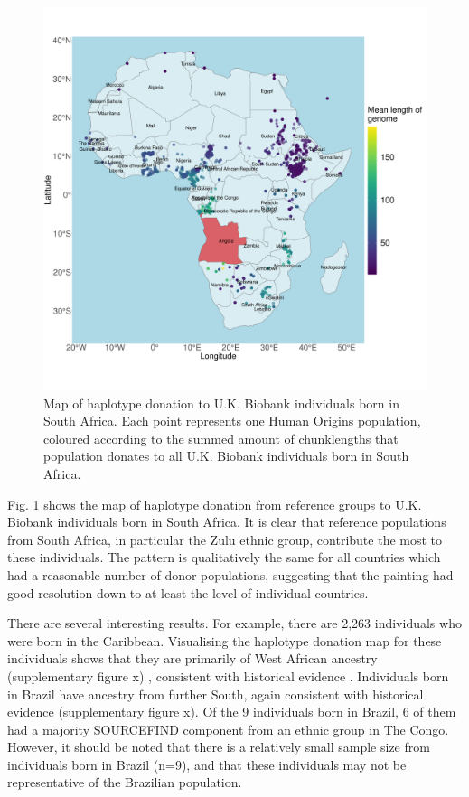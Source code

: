 \begin{figure}[htp]
    \centering
    \includegraphics[width=1.0\textwidth]{../images/chapter3/haplotype_map_SouthAfrica.pdf}
    \caption{Map of haplotype donation to U.K. Biobank individuals born in South Africa. Each point represents one Human Origins population, coloured according to the summed amount of chunklengths that population donates to all U.K. Biobank individuals born in South Africa. }
    \label{fig:haplotype_map_SouthAfrica}
\end{figure}

Fig. \ref{fig:haplotype_map_SouthAfrica} shows the map of haplotype donation from reference groups to U.K. Biobank individuals born in South Africa. It is clear that reference populations from South Africa, in particular the Zulu ethnic group, contribute the most to these individuals. The pattern is qualitatively the same for all countries which had a reasonable number of donor populations, suggesting that the painting had good resolution down to at least the level of individual countries.

There are several interesting results. For example, there are 2,263 individuals who were born in the Caribbean. Visualising the haplotype donation map for these individuals shows that they are primarily of West African ancestry (supplementary figure x) , consistent with historical evidence \cite{micheletti2020genetic}. Individuals born in Brazil have ancestry from further South, again consistent with historical evidence (supplementary figure x). Of the 9 individuals born in Brazil, 6 of them had a majority SOURCEFIND component from an ethnic group in The Congo. However, it should be noted that there is a relatively small sample size from individuals born in Brazil (n=9), and that these individuals may not be representative of the Brazilian population. 

